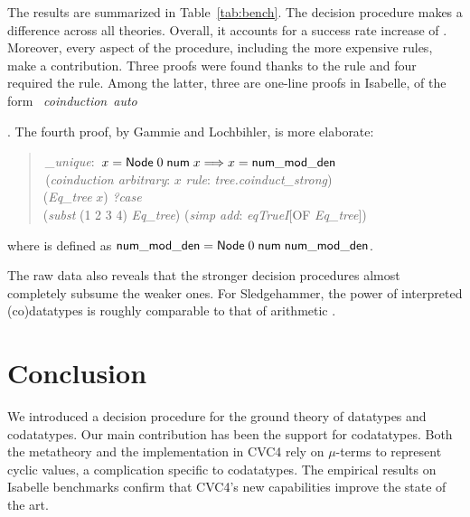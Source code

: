 The results are summarized in Table~\ref{tab:bench}. The decision procedure
makes a difference across all theories. Overall, it accounts for a success rate
increase of . Moreover, every aspect of the procedure, including the
more expensive rules, make a contribution.
%
Three proofs were found thanks to
the  rule and four required the  rule. Among the latter,
three are one-line proofs in Isabelle, of the form
~\textit{coinduction}~\textit{auto}\begin{rep} \cite{blanchette-et-al-2014-impl}\end{rep}.
The fourth proof, by Gammie and Lochbihler, is more elaborate:
%
\begin{quote}
 \,\textit{\nummodden\_unique}: \,$x = \textsf{Node}\;0\;\textsf{num}\; x \Longrightarrow x = \textsf{num\hbox{\rm\_}mod\hbox{\rm\_}den}$ \\
 \,(\textit{coinduction arbitrary}: $x$ \textit{rule}: \textit{tree.coinduct\_strong}) \\
\noindent\hbox{}\quad  {} (\textit{Eq\_tree} $x$)  \textit{?case} \\
\noindent\hbox{}\qquad  {} (\textit{subst} (1 2 3 4) \textit{Eq\_tree}) (\textit{simp add}: \textit{eqTrueI}[OF \textit{Eq\_tree}]) \\
\end{quote}
%
\noindent
where \const{\nummodden} is defined as $\textsf{num\hbox{\rm\_}mod\hbox{\rm\_}den} =
\textsf{Node}\;0\;\textsf{num}\;\textsf{num\hbox{\rm\_}mod\hbox{\rm\_}den}$.

The raw data also reveals that the
stronger decision procedures almost completely subsume the weaker ones. For
Sledgehammer, the power of interpreted (co)datatypes is roughly comparable to
that of arithmetic \cite{blanchette-et-al-2013-smt}.

\section{Conclusion}
\label{sec:conclusion}

We introduced a decision procedure for the ground theory of datatypes and
codatatypes. Our main
contribution has been the support for codatatypes. Both the metatheory and
the implementation in CVC4 rely on $\mu$-terms to represent cyclic values,
a complication specific to codatatypes.
The empirical results on Isabelle benchmarks
confirm that CVC4's new capabilities improve the state of the art.

